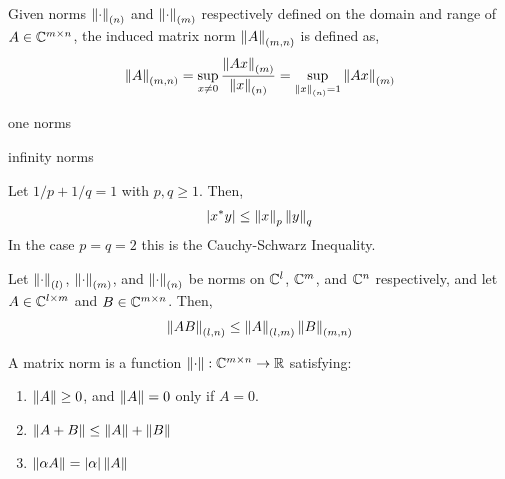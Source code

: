 \documentclass[12pt]{article}
\begin{document}
\begin{definition}
Given norms \( \left\lVert\cdot\right\rVert_{(n)} \) and \( \left\lVert\cdot\right\rVert_{(m)} \) respectively defined on the domain and range of \( A\in\mathbb{C}^{m\times n} \), the induced matrix norm \( \left\lVert A\right\rVert_{(m,n)} \) is defined as,
\begin{align*}
    \left\lVert A\right\rVert_{(m,n)}
    = \sup_{x\neq 0} \dfrac{\left\lVert Ax\right\rVert_{(m)}}{\left\lVert x\right\rVert_{(n)}}
    = \sup_{\left\lVert x\right\rVert_{(n)} =1 } \left\lVert Ax\right\rVert_{(m)}
\end{align*}
\end{definition}

one norms

infinity norms

\begin{theorem}
Let \( 1/p+1/q = 1 \) with \( p,q\geq 1 \). Then,
\begin{align*}
    |x^*y| \leq \left\lVert x\right\rVert_p\left\lVert y\right\rVert_q
\end{align*}
In the case \( p=q=2 \) this is the Cauchy-Schwarz Inequality.
\end{theorem}



\begin{theorem}
Let \( \left\lVert\cdot\right\rVert_{(l)} \), \( \left\lVert\cdot\right\rVert_{(m)} \), and \( \left\lVert\cdot\right\rVert_{(n)} \) be norms on \( \mathbb{C}^l \), \( \mathbb{C}^m \), and \( \mathbb{C}^n \) respectively, and let \( A\in\mathbb{C}^{l\times m} \) and \( B\in \mathbb{C}^{m\times n} \). Then,
\begin{align*}
    \left\lVert AB\right\rVert_{(l,n)} \leq \left\lVert A\right\rVert_{(l,m)}\left\lVert B\right\rVert_{(m,n)}
\end{align*}
\end{theorem}


\begin{definition}
A matrix norm is a function \( \left\lVert\cdot\right\rVert:\mathbb{C}^{m\times n}\to\mathbb{R} \) satisfying:
\begin{enumerate}[label=(\roman*), nolistsep]
    \item \( \left\lVert A\right\rVert \geq 0 \), and \( \left\lVert A\right\rVert = 0 \) only if \( A = 0 \).
    \item \( \left\lVert A+B\right\rVert\leq \left\lVert A\right\rVert + \left\lVert B\right\rVert \)
    \item \( \left\lVert\alpha A\right\rVert = |\alpha| \left\lVert A\right\rVert \)
\end{enumerate}
\end{definition}

\begin{definition}
\end{definition}
\end{document}
